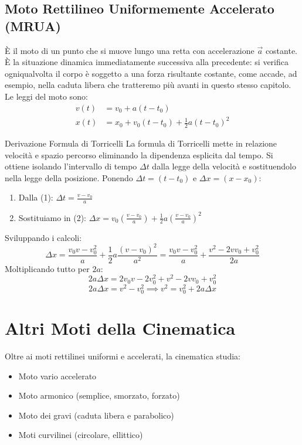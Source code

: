 \subsection{Moto Rettilineo Uniformemente Accelerato (MRUA)}
È il moto di un punto che si muove lungo una retta con accelerazione $\vec{a}$ costante. È la situazione dinamica immediatamente successiva alla precedente: si verifica ogniqualvolta il corpo è soggetto a una forza risultante costante, come accade, ad esempio, nella caduta libera che tratteremo più avanti in questo stesso capitolo.
Le leggi del moto sono:
\begin{align}
    v(t) &= v_0 + a(t - t_0) \\
    x(t) &= x_0 + v_0(t - t_0) + \frac{1}{2}a(t - t_0)^2
\end{align}

\begin{osservazione}{Derivazione Formula di Torricelli}
La formula di Torricelli mette in relazione velocità e spazio percorso eliminando la dipendenza esplicita dal tempo. Si ottiene isolando l'intervallo di tempo $\Delta t$ dalla legge della velocità e sostituendolo nella legge della posizione.
Ponendo $\Delta t = (t - t_0)$ e $\Delta x = (x - x_0)$:
\begin{enumerate}
    \item Dalla (1): $\Delta t = \frac{v - v_0}{a}$
    \item Sostituiamo in (2): $\Delta x = v_0 \left( \frac{v - v_0}{a} \right) + \frac{1}{2} a \left( \frac{v - v_0}{a} \right)^2$
\end{enumerate}
Sviluppando i calcoli:
\begin{equation}
    \Delta x = \frac{v_0 v - v_0^2}{a} + \frac{1}{2} a \frac{(v - v_0)^2}{a^2} = \frac{v_0 v - v_0^2}{a} + \frac{v^2 - 2v v_0 + v_0^2}{2a}
\end{equation}
Moltiplicando tutto per $2a$:
\begin{equation}
    2a \Delta x = 2v_0 v - 2v_0^2 + v^2 - 2v v_0 + v_0^2
\end{equation}
\begin{equation}
    2a \Delta x = v^2 - v_0^2 \implies \boxed{v^2 = v_0^2 + 2a \Delta x}
\end{equation}
\end{osservazione}

\section{Altri Moti della Cinematica}
Oltre ai moti rettilinei uniformi e accelerati, la cinematica studia:
\begin{itemize}
    \item Moto vario accelerato
    \item Moto armonico (semplice, smorzato, forzato)
    \item Moto dei gravi (caduta libera e parabolico)
    \item Moti curvilinei (circolare, ellittico)
\end{itemize}

